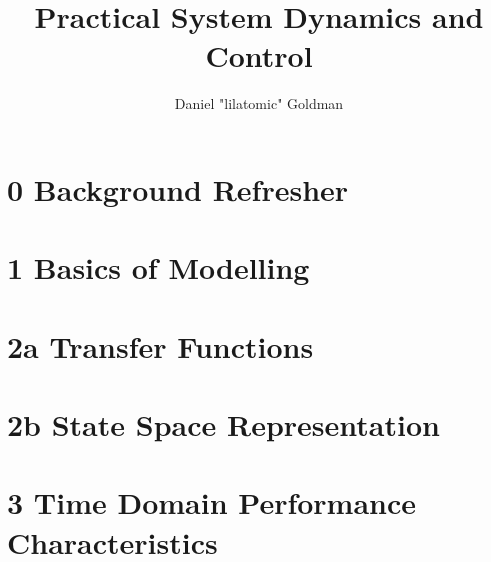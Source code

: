 \documentclass{templates/topic}
\title{Practical System Dynamics and Control}
\author{Daniel "lilatomic" Goldman}
\begin{document}
\maketitle

\part*{0 Background Refresher}



\part*{1 Basics of Modelling}





\part*{2a Transfer Functions}







\part*{2b State Space Representation}






\part*{3 Time Domain Performance Characteristics}



\end{document}
